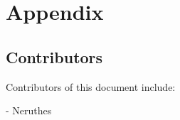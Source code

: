 \section*{Appendix}

\subsection*{Contributors}

Contributors of this document include:

- Neruthes

